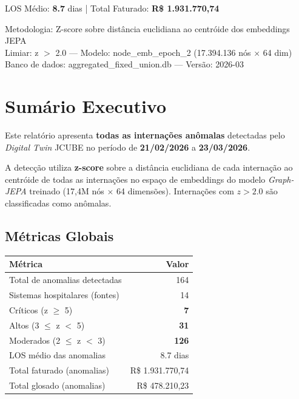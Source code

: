 \documentclass[a4paper,10pt]{article}
\begin{document}
\begin{titlepage}
\begin{center}
\begin{tcolorbox}[colback=lightblue,colframe=jcubeblue,width=0.85\textwidth,halign=center]
LOS M\'{e}dio: \textbf{8.7} dias \quad | \quad Total Faturado: \textbf{R\$ 1.931.770,74}\\
\end{tcolorbox}

\vfill
{\small\textcolor{jcubegray}{
Metodologia: Z-score sobre dist\^{a}ncia euclidiana ao centr\'{o}ide dos embeddings JEPA\\
Limiar: z $>$ 2.0 --- Modelo: node\_emb\_epoch\_2 (17.394.136 n\'{o}s $\times$ 64 dim)\\
Banco de dados: aggregated\_fixed\_union.db --- Vers\~{a}o: 2026-03
}}
\end{center}
\end{titlepage}

\tableofcontents\clearpage
\section{Sum\'{a}rio Executivo}

Este relat\'{o}rio apresenta \textbf{todas as interna\c{c}\~{o}es an\^{o}malas} detectadas pelo
\textit{Digital Twin} JCUBE no per\'{i}odo de \textbf{21/02/2026} a \textbf{23/03/2026}.

A detec\c{c}\~{a}o utiliza \textbf{z-score} sobre a dist\^{a}ncia euclidiana de cada interna\c{c}\~{a}o ao
centr\'{o}ide de todas as interna\c{c}\~{o}es no espa\c{c}o de embeddings do modelo \textit{Graph-JEPA}
treinado (17,4M n\'{o}s $\times$ 64 dimens\~{o}es). Interna\c{c}\~{o}es com $z > 2.0$ s\~{a}o classificadas como an\^{o}malas.

\subsection{M\'{e}tricas Globais}
\begin{center}
\begin{tabular}{lr}
\toprule
\textbf{M\'{e}trica} & \textbf{Valor} \\
\midrule
Total de anomalias detectadas & 164 \\
Sistemas hospitalares (fontes) & 14 \\
Cr\'{i}ticos (z $\geq$ 5) & \textcolor{anomred}{\textbf{7}} \\
Altos (3 $\leq$ z $<$ 5) & \textcolor{anomorange}{\textbf{31}} \\
Moderados (2 $\leq$ z $<$ 3) & \textcolor{anomyellow}{\textbf{126}} \\
LOS m\'{e}dio das anomalias & 8.7 dias \\

Total faturado (anomalias) & R\$ 1.931.770,74 \\

Total glosado (anomalias) & \textcolor{anomred}{R\$ 478.210,23} \\

\bottomrule
\end{tabular}
\end{center}
\end{document}
